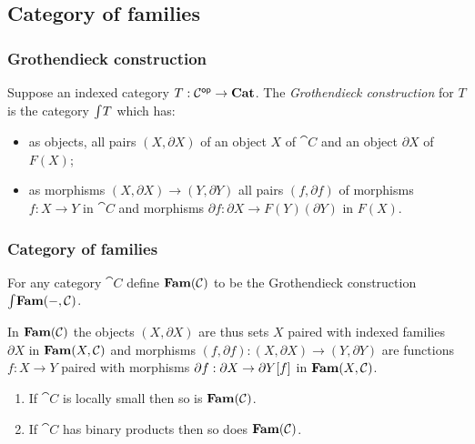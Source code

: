 \subsection{Category of families}
\label{sec:grothendieck}

\subsubsection{Grothendieck construction}

\begin{definition}
Suppose an indexed category $T: \mathcal{C}^{\mathsf{op}} \to \mathbf{Cat}$. The \emph{Grothendieck construction}
for $T$ is the category $\int_{}T$ which has:
\begin{itemize}
\item as objects, all pairs $(X, \partial X)$ of an object $X$ of $\cat{C}$ and an object $\partial X$ of $F(X)$;
\item as morphisms $(X, \partial X) \to (Y, \partial Y)$ all pairs $(f, \partial f)$ of morphisms $f: X
\to Y$ in $\cat{C}$ and morphisms $\partial f: \partial X \to F(Y)(\partial Y)$ in $F(X)$.
\end{itemize}
\end{definition}

\subsubsection{Category of families}

\begin{definition}
For any category $\cat{C}$ define $\mathbf{Fam}(\mathcal{C})$ to be the Grothendieck construction
$\int_{}\mathbf{Fam}(-,\mathcal{C})$.
\end{definition}

\noindent In $\mathbf{Fam}(\mathcal{C})$ the objects $(X, \partial X)$ are thus sets $X$ paired with indexed families
$\partial X$ in $\mathbf{Fam}(X,\mathcal{C})$ and morphisms $(f, \partial f): (X, \partial X) \to (Y, \partial Y)$ are
functions $f: X \to Y$ paired with morphisms $\partial f: \partial X \to \partial Y[f]$ in
$\mathbf{Fam}(X,\mathcal{C})$.

\begin{proposition}
\item
\begin{enumerate}
\item If $\cat{C}$ is locally small then so is $\mathbf{Fam}(\mathcal{C})$.
\item If $\cat{C}$ has binary products then so does $\mathbf{Fam}(\mathcal{C})$.
\end{enumerate}
\end{proposition}

